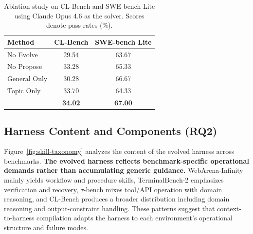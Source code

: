 \begin{table}[t]
\centering
\caption{Ablation study on CL-Bench and SWE-bench Lite using Claude Opus 4.6 as the solver. Scores denote pass rates (\%).}
\label{tab:ablation-cl-swe}
\vspace{3pt}
\small
\begin{tabular}{lcc}
\toprule
\textbf{Method} & \textbf{CL-Bench} & \textbf{SWE-bench Lite} \\
\midrule
No Evolve & 29.54 & 63.67 \\ \midrule
No Propose & 33.28 & 65.33 \\
General Only & 30.28 & 66.67 \\
Topic Only & 33.70 & 64.33 \\
\midrule
\algname{} & \textbf{34.02} & \textbf{67.00} \\
\bottomrule
\end{tabular}
\vspace{-5pt}
\end{table}

\subsection{Harness Content and Components (RQ2)}
\label{sec:exp-harness-analysis}


Figure~\ref{fig:skill-taxonomy} analyzes the content of the evolved harness across benchmarks. 
\textbf{The evolved harness reflects benchmark-specific operational demands rather than accumulating generic guidance.}
WebArena-Infinity mainly yields workflow and procedure skills, TerminalBench-2 emphasizes verification and recovery, $\tau$-bench mixes tool/API operation with domain reasoning, and CL-Bench produces a broader distribution including domain reasoning and output-constraint handling. These patterns suggest that context-to-harness compilation adapts the harness to each environment's operational structure and failure modes.



